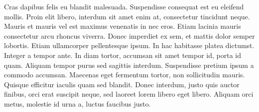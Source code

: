 \par
Cras dapibus felis eu blandit malesuada. Suspendisse consequat est eu eleifend mollis. Proin elit libero, interdum sit amet enim at, consectetur tincidunt neque. Mauris et mauris vel est maximus venenatis in nec eros. Etiam lacinia mauris consectetur arcu rhoncus viverra. Donec imperdiet ex sem, et mattis dolor semper lobortis. Etiam ullamcorper pellentesque ipsum. In hac habitasse platea dictumst. Integer a tempor ante. In diam tortor, accumsan sit amet tempor id, porta id quam. Aliquam tempor purus sed sagittis interdum. Suspendisse pretium ipsum a commodo accumsan. Maecenas eget fermentum tortor, non sollicitudin mauris. Quisque efficitur iaculis quam sed blandit. Donec interdum, justo quis auctor finibus, orci erat suscipit neque, sed laoreet lorem libero eget libero. Aliquam orci metus, molestie id urna a, luctus faucibus justo.
